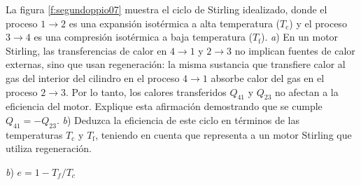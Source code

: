 %
\begin{Exercise}\label{p:segundoppio07}
  La figura \ref{f:segundoppio07} muestra el ciclo de Stirling idealizado, donde el proceso $1 \rightarrow 2$ es una expansión isotérmica a alta temperatura ($T_\text{c}$) y el proceso $3 \rightarrow 4$ es una compresión isotérmica a baja temperatura ($T_\text{f}$). \textit{a}) En un motor Stirling, las transferencias de calor en $4 \rightarrow 1$ y $2 \rightarrow 3$ no implican fuentes de calor externas, sino que usan regeneración: la misma sustancia que transfiere calor al gas del interior del cilindro en el proceso $4 \rightarrow 1$ absorbe calor del gas en el proceso $2 \rightarrow 3$. Por lo tanto, los calores transferidos $Q_{41}$ y $Q_{23}$ no afectan a la eficiencia del motor. Explique esta afirmación demostrando que se cumple $Q_{41} = - Q_{23}$. \textit{b}) Deduzca la eficiencia de este ciclo en términos de las temperaturas $T_\text{c}$ y $T_\text{f}$, teniendo en cuenta que representa a un motor Stirling que utiliza regeneración.
\end{Exercise}
\begin{Answer}
	\begin{minipage}[t]{.4\textwidth}
    \textit{b}) $e = 1 - T_f/T_c$
  \end{minipage}
\end{Answer}
%
